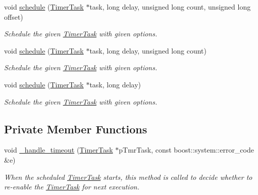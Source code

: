 \begin{DoxyCompactItemize}
\item 
void \hyperlink{class_e_l_f_i_n_1_1_scheduler_a22971289baf155b0714f2951fc4da1ad}{schedule} (\hyperlink{class_e_l_f_i_n_1_1_timer_task}{Timer\-Task} $\ast$task, long delay, unsigned long count, unsigned long offset)
\begin{DoxyCompactList}\small\item\em Schedule the given \hyperlink{class_e_l_f_i_n_1_1_timer_task}{Timer\-Task} with given options. \end{DoxyCompactList}\item 
void \hyperlink{class_e_l_f_i_n_1_1_scheduler_ae03411cae920643c05fcbecdf7e0f57b}{schedule} (\hyperlink{class_e_l_f_i_n_1_1_timer_task}{Timer\-Task} $\ast$task, long delay, unsigned long count)
\begin{DoxyCompactList}\small\item\em Schedule the given \hyperlink{class_e_l_f_i_n_1_1_timer_task}{Timer\-Task} with given options. \end{DoxyCompactList}\item 
void \hyperlink{class_e_l_f_i_n_1_1_scheduler_a9fa87c60a1bc78a653b1bf053220769f}{schedule} (\hyperlink{class_e_l_f_i_n_1_1_timer_task}{Timer\-Task} $\ast$task, long delay)
\begin{DoxyCompactList}\small\item\em Schedule the given \hyperlink{class_e_l_f_i_n_1_1_timer_task}{Timer\-Task} with given options. \end{DoxyCompactList}\end{DoxyCompactItemize}

\subsection*{Private Member Functions}
\begin{DoxyCompactItemize}
\item 
void \hyperlink{class_e_l_f_i_n_1_1_scheduler_a15ccc0fd833cb9e4bed78b263d43063e}{\-\_\-handle\-\_\-timeout} (\hyperlink{class_e_l_f_i_n_1_1_timer_task}{Timer\-Task} $\ast$p\-Tmr\-Task, const boost\-::system\-::error\-\_\-code \&e)
\begin{DoxyCompactList}\small\item\em When the scheduled \hyperlink{class_e_l_f_i_n_1_1_timer_task}{Timer\-Task} starts, this method is called to decide whether to re-\/enable the \hyperlink{class_e_l_f_i_n_1_1_timer_task}{Timer\-Task} for next execution. \end{DoxyCompactList}\end{DoxyCompactItemize}
